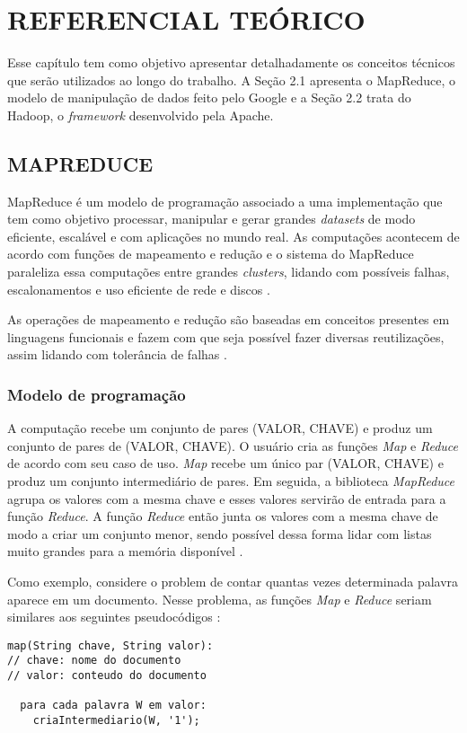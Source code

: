 \chapter{REFERENCIAL TEÓRICO} \label{cha:refteorico}

Esse capítulo tem como objetivo apresentar detalhadamente os conceitos técnicos que serão utilizados ao longo do trabalho. A Seção 2.1 apresenta o MapReduce, o modelo de manipulação de dados feito pelo Google e a Seção 2.2 trata do Hadoop, o \textit{framework} desenvolvido pela Apache.

\section{MAPREDUCE} \label{sec:mapreduce}

MapReduce é um modelo de programação associado a uma implementação que tem como objetivo processar, manipular e gerar grandes \textit{datasets} de modo eficiente, escalável e com aplicações no mundo real. As computações acontecem de acordo com funções de mapeamento e redução e o sistema do MapReduce paraleliza essa computações entre grandes \textit{clusters}, lidando com possíveis falhas, escalonamentos e uso eficiente de rede e discos \cite{MapReduce08}.

As operações de mapeamento e redução são baseadas em conceitos presentes em linguagens funcionais e fazem com que seja possível fazer diversas reutilizações, assim lidando com tolerância de falhas \cite{MapReduce08}. 

\subsection{Modelo de programação}\label{ssec:mapreducemodelo}

A computação recebe um conjunto de pares (VALOR, CHAVE) e produz um conjunto de pares de (VALOR, CHAVE). O usuário cria as funções \textit{Map} e \textit{Reduce} de acordo com seu caso de uso. \textit{Map} recebe um único par (VALOR, CHAVE) e produz um conjunto intermediário de pares. Em seguida, a biblioteca \textit{MapReduce} agrupa os valores com a mesma chave e esses valores servirão de entrada para a função \textit{Reduce}. A função \textit{Reduce} então junta os valores com a mesma chave de modo a criar um conjunto menor, sendo possível dessa forma lidar com listas muito grandes para a memória disponível \cite{MapReduce04}.

Como exemplo, considere o problem de contar quantas vezes determinada palavra aparece em um documento. Nesse problema, as funções \textit{Map} e \textit{Reduce} seriam similares aos seguintes pseudocódigos \cite{MapReduce08}:
\newpage
\begin{lstlisting}[title={Código 1: Exemplo de função Map em pseudocódigo adaptado de \cite{MapReduce08}}]
map(String chave, String valor):
// chave: nome do documento
// valor: conteudo do documento

  para cada palavra W em valor:
    criaIntermediario(W, '1');
\end{lstlisting}

